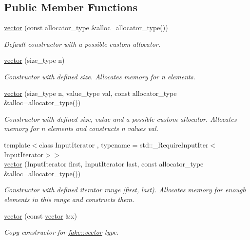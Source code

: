 \subsection*{Public Member Functions}
\begin{DoxyCompactItemize}
\item 
\mbox{\hyperlink{classfake_1_1vector_a154ffc548c4e8e0684c6928ab0b7d753}{vector}} (const allocator\+\_\+type \&alloc=allocator\+\_\+type())
\begin{DoxyCompactList}\small\item\em Default constructor with a possible custom allocator. \end{DoxyCompactList}\item 
\mbox{\hyperlink{classfake_1_1vector_a3dec57e3a9ad5a085291f8ce5ba23465}{vector}} (size\+\_\+type n)
\begin{DoxyCompactList}\small\item\em Constructor with defined size. Allocates memory for n elements. \end{DoxyCompactList}\item 
\mbox{\hyperlink{classfake_1_1vector_a5660b1ba62f11951f93eb603741c08a3}{vector}} (size\+\_\+type n, value\+\_\+type val, const allocator\+\_\+type \&alloc=allocator\+\_\+type())
\begin{DoxyCompactList}\small\item\em Constructor with defined size, value and a possible custom allocator. Allocates memory for n elements and constructs n values val. \end{DoxyCompactList}\item 
{\footnotesize template$<$class Input\+Iterator , typename  = std\+::\+\_\+\+Require\+Input\+Iter$<$\+Input\+Iterator$>$$>$ }\\\mbox{\hyperlink{classfake_1_1vector_a674cc1fdbef23b69831facc689209a93}{vector}} (Input\+Iterator first, Input\+Iterator last, const allocator\+\_\+type \&alloc=allocator\+\_\+type())
\begin{DoxyCompactList}\small\item\em Constructor with defined iterator range \mbox{[}first, last). Allocates memory for enough elements in this range and constructs them. \end{DoxyCompactList}\item 
\mbox{\hyperlink{classfake_1_1vector_a706c0c31eae10462a2e16f1cdfd8e665}{vector}} (const \mbox{\hyperlink{classfake_1_1vector}{vector}} \&x)
\begin{DoxyCompactList}\small\item\em Copy constructor for \mbox{\hyperlink{classfake_1_1vector}{fake\+::vector}} type. \end{DoxyCompactList}\item 

\end{DoxyCompactItemize}
